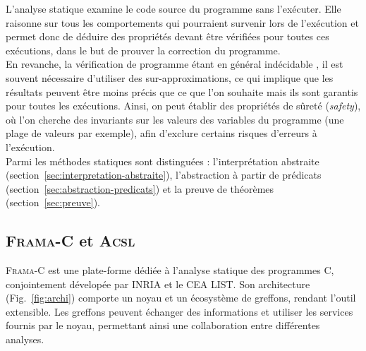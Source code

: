 L'analyse statique \cite{static-analysis} examine le code source du programme
sans l'exécuter. Elle raisonne sur tous les comportements qui pourraient
survenir lors de l'exécution et permet donc de déduire des propriétés devant
être vérifiées pour toutes ces exécutions, dans le but de prouver la correction
du programme.\\

En revanche, la vérification de programme étant en général indécidable
\cite{undecidability}, il est souvent nécessaire d'utiliser des
sur-approximations, ce qui implique que les résultats peuvent être moins précis
que ce que l'on souhaite mais ils sont garantis pour toutes les exécutions.
Ainsi, on peut établir des propriétés de sûreté ({\em safety}), où l’on cherche
des invariants sur les valeurs des variables du programme (une plage de valeurs
par exemple), afin d'exclure certains risques d'erreurs à l'exécution.\\

Parmi les méthodes statiques sont distinguées : l'interprétation abstraite
(section~\ref{sec:interpretation-abstraite}), l'abstraction à partir de
prédicats (section~\ref{sec:abstraction-predicats}) et la preuve de théorèmes
(section~\ref{sec:preuve}).



\subsection{\textsc{Frama-C} et \textsc{Acsl}}
\label{sec:frama-c}

\textsc{Frama-C} \cite{Frama-C} est une plate-forme dédiée à l'analyse statique
des programmes C, conjointement dévelopée par INRIA et le CEA LIST. Son
architecture (Fig.~\ref{fig:archi}) comporte un noyau et un écosystème de
greffons, rendant l’outil extensible. Les greffons peuvent échanger des
informations et utiliser les  services fournis par le noyau, permettant ainsi
une collaboration entre différentes analyses.\\


\newcommand{\lang}[1]{\textsf{\small #1}\xspace}
\newcommand{\cil}{\lang{CIL}}
\newcommand{\C}{\lang{C}}
\newcommand{\ACSL}{\lang{ACSL}}
\newcommand{\JML}{\lang{JML}}
\newcommand{\framac}{\lang{Frama-C}}
\newcommand{\pathcrawler}{\lang{PathCrawler}}
\newcommand{\colibri}{\lang{Colibri}}


